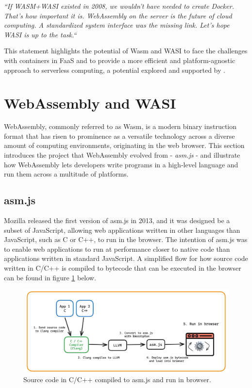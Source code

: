 \documentclass[
  table]{report}
\begin{document}
\begin{displayquote}
\textit{ ``If WASM+WASI existed in 2008, we wouldn't have needed to create Docker.
That's how important it is. WebAssembly on the server is the future of cloud
computing. A standardized system interface was the missing link. Let's hope WASI
is up to the task.`` \citep{hykesOne2019} }
\end{displayquote}

This statement highlights the potential of \ac{Wasm} and \ac{WASI} to
face the challenges with containers in FaaS and to provide a more
efficient and platform-agnostic approach to serverless computing, a
potential explored and supported by
\citet{kjorveziroskiEvaluatingWebAssemblyOrchestrated2022}.

\section{WebAssembly and WASI}
\label{sect:wasmwasi}

WebAssembly, commonly referred to as Wasm, is a modern binary
instruction format that has risen to prominence as a versatile
technology across a diverse amount of computing environments,
originating in the web browser. This section introduces the project that
WebAssembly evolved from - \emph{asm.js} - and illustrate how
WebAssembly lets developers write programs in a high-level language and
run them across a multitude of platforms.

\subsection{asm.js}
\label{subsect:asm}

Mozilla released the first version of asm.js in 2013, and it was
designed be a subset of JavaScript, allowing web applications written in
other languages than JavaScript, such as C or C++, to run in the
browser. The intention of asm.js was to enable web applications to run
at performance closer to native code than applications written in
standard JavaScript. A simplified flow for how source code written in
C/C++ is compiled to bytecode that can be executed in the browser can be
found in figure \ref{fig:asm-figure} below.

\begin{figure}[H]
\centering
  \includegraphics{assets/asm.js-figure.png}
\caption{Source code in C/C++ compiled to asm.js and run in browser.}\label{fig:asm-figure}
\end{figure}
\end{document}
